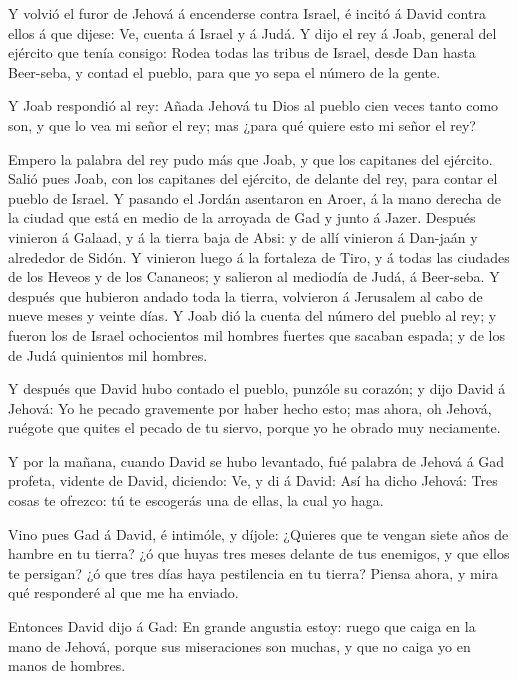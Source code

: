  Y volvió el furor de Jehová á encenderse contra Israel, é
incitó á David contra ellos á que dijese: Ve, cuenta á Israel y á Judá.
 Y dijo el rey á Joab, general del ejército que tenía
consigo: Rodea todas las tribus de Israel, desde Dan hasta Beer-seba, y
contad el pueblo, para que yo sepa el número de la gente.

 Y Joab respondió al rey: Añada Jehová tu Dios al pueblo
cien veces tanto como son, y que lo vea mi señor el rey; mas ¿para qué
quiere esto mi señor el rey?

 Empero la palabra del rey pudo más que Joab, y que los
capitanes del ejército. Salió pues Joab, con los capitanes del ejército,
de delante del rey, para contar el pueblo de Israel.  Y
pasando el Jordán asentaron en Aroer, á la mano derecha de la ciudad que
está en medio de la arroyada de Gad y junto á Jazer. 
Después vinieron á Galaad, y á la tierra baja de Absi: y de allí
vinieron á Dan-jaán y alrededor de Sidón.  Y vinieron luego
á la fortaleza de Tiro, y á todas las ciudades de los Heveos y de los
Cananeos; y salieron al mediodía de Judá, á Beer-seba.  Y
después que hubieron andado toda la tierra, volvieron á Jerusalem al
cabo de nueve meses y veinte días.  Y Joab dió la cuenta del
número del pueblo al rey; y fueron los de Israel ochocientos mil hombres
fuertes que sacaban espada; y de los de Judá quinientos mil hombres.

 Y después que David hubo contado el pueblo, punzóle su
corazón; y dijo David á Jehová: Yo he pecado gravemente por haber hecho
esto; mas ahora, oh Jehová, ruégote que quites el pecado de tu siervo,
porque yo he obrado muy neciamente.

 Y por la mañana, cuando David se hubo levantado, fué
palabra de Jehová á Gad profeta, vidente de David, diciendo:
 Ve, y di á David: Así ha dicho Jehová: Tres cosas te
ofrezco: tú te escogerás una de ellas, la cual yo haga.

 Vino pues Gad á David, é intimóle, y díjole: ¿Quieres que
te vengan siete años de hambre en tu tierra? ¿ó que huyas tres meses
delante de tus enemigos, y que ellos te persigan? ¿ó que tres días haya
pestilencia en tu tierra? Piensa ahora, y mira qué responderé al que me
ha enviado.

 Entonces David dijo á Gad: En grande angustia estoy: ruego
que caiga en la mano de Jehová, porque sus miseraciones son muchas, y
que no caiga yo en manos de hombres.

